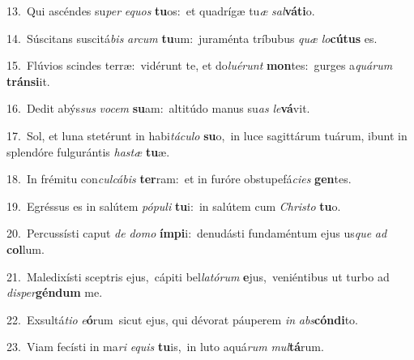 {\numbfont\textcolor{\numbcolor}{13.}}~Qui ascéndes su\textit{per} \textit{e}\-\textit{quos} \textbf{tu}\-os:~\star et quadrígæ tu\textit{æ} \textit{sal}\-\textbf{vá}\textbf{ti}o.\par
{\numbfont\textcolor{\numbcolor}{14.}}~Súscitans suscitá\textit{bis} \textit{ar}\-\textit{cum} \textbf{tu}\-um:~\star juraménta tríbubus \textit{quæ} \textit{lo}\-\textbf{cú}\textbf{tus} es.\par
{\numbfont\textcolor{\numbcolor}{15.}}~Flúvios scindes terræ:~\dagger vidérunt te, et do\-\textit{lu}\-\textit{é}\textit{runt} \textbf{mon}\-tes:~\star gurges a\-\textit{quá}\-\textit{rum} \textbf{tráns}\-\textbf{i}it.\par
{\numbfont\textcolor{\numbcolor}{16.}}~Dedit abýs\textit{sus} \textit{vo}\-\textit{cem} \textbf{su}\-am:~\star altitúdo manus su\textit{as} \textit{le}\-\textbf{vá}vit.\par
{\numbfont\textcolor{\numbcolor}{17.}}~Sol, et luna stetérunt in habi\-\textit{tá}\-\textit{cu}\textit{lo} \textbf{su}\-o,~\star in luce sagittárum tuárum, ibunt in splendóre fulgurántis \textit{has}\-\textit{tæ} \textbf{tu}\-æ.\par
{\numbfont\textcolor{\numbcolor}{18.}}~In frémitu con\-\textit{cul}\-\textit{cá}\textit{bis} \textbf{ter}\-ram:~\star et in furóre obstupefá\-\textit{ci}\-\textit{es} \textbf{gen}\-tes.\par
{\numbfont\textcolor{\numbcolor}{19.}}~Egréssus es in salútem \textit{pó}\-\textit{pu}\textit{li} \textbf{tu}\-i:~\star in salútem cum \textit{Chris}\-\textit{to} \textbf{tu}\-o.\par
{\numbfont\textcolor{\numbcolor}{20.}}~Percussísti caput \textit{de} \textit{do}\-\textit{mo} \textbf{ím}\-\textbf{pi}i:~\star denudásti fundaméntum ejus us\textit{que} \textit{ad} \textbf{col}\-lum.\par
{\numbfont\textcolor{\numbcolor}{21.}}~Maledixísti sceptris ejus,~\dagger cápiti bel\-\textit{la}\-\textit{tó}\textit{rum} \textbf{e}\-jus,~\star veniéntibus ut turbo ad \textit{di}\-\textit{sper}\textbf{gén}\textbf{dum} me.\par
{\numbfont\textcolor{\numbcolor}{22.}}~Exsultá\-\textit{ti}\-\textit{o} \textit{e}\-\textbf{ó}rum~\star sicut ejus, qui dévorat páuperem \textit{in} \textit{abs}\-\textbf{cón}\textbf{di}to.\par
{\numbfont\textcolor{\numbcolor}{23.}}~Viam fecísti in ma\textit{ri} \textit{e}\-\textit{quis} \textbf{tu}\-is,~\star in luto aquá\textit{rum} \textit{mul}\-\textbf{tá}rum.\par
